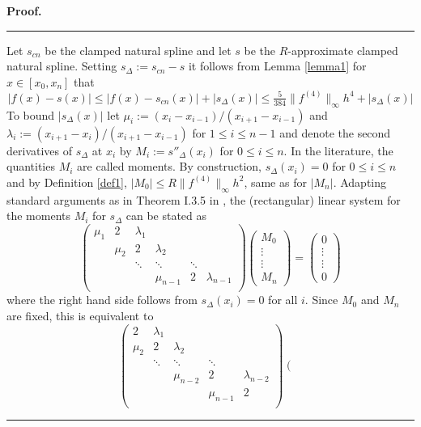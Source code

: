 \documentclass[12pt]{article}
\newenvironment{proof}{\begin{list}{$\!\!${\bf Proof.}%
  \rule{1pt}{0pt}}{\setlength{\leftmargin}{0pt}%
  \setlength{\itemindent}{30pt}%
  \setlength{\listparindent}{15pt}}\item}{\rule{0.3em}{0mm}%
  \hfill\framebox[1.2ex]{\rule{0.3em}{0mm}}\end{list}}
\begin{document}
\begin{proof}
Let $s_{cn}$ be the clamped natural spline and let $s$
be the $R$-approximate clamped natural spline. Setting $s_\Delta:=s_{cn}-s$
it follows from Lemma \ref{lemma1}  for $x\in[x_0,x_n]$ that
$$
|f(x)-s(x)|\le |f(x)-s_{cn}(x)| + |s_\Delta(x)|
\le \tfrac{5}{384}\|f^{(4)}\|_\infty h^4+ |s_\Delta(x)|
$$
To bound $ |s_\Delta(x)|$
let $\mu_i:=(x_{i}-x_{i-1})/(x_{i+1}-x_{i-1})$ and $\lambda_i:=(x_{i+1}-x_{i})/(x_{i+1}-x_{i-1})$
for $1\le i\le n-1$
and denote the second derivatives of $s_\Delta$ at $x_i$ by $M_i:=s''_\Delta(x_i)$
for $0\le i\le n$. In the literature, the quantities
$M_i$ are called moments.
By construction, $s_\Delta(x_i)=0$ for  $0\le i\le n$
and by Definition \ref{def1},
$|M_0|\le R\|f^{(4)}\|_\infty h^2$,
same as for $|M_n|$.
Adapting standard arguments as in Theorem I.3.5 in \cite{Verfuerth},
the (rectangular) linear system for the moments $M_i$
for $s_\Delta$ can be stated as
$$
\left(\begin{matrix}
  \mu_1 & 2 & \lambda_1 & & & \\
  & \mu_2 & 2 & \lambda_2 & & \\
  & & \ddots & \ddots & \ddots & \\ 
  & & & \mu_{n-1} & 2 & \lambda_{n-1}  \\
\end{matrix}\right)
\left(\begin{matrix}
  M_0  \\
  \vdots \\
  \vdots \\
  M_n    
\end{matrix}\right)
=
\left(\begin{matrix}
  0  \\
  \vdots \\
  \vdots \\
  0    
\end{matrix}\right)
$$
where the right hand side follows from   $s_\Delta(x_i)=0$ for all $i$.
Since $M_0$ and $M_n$ are fixed, this is equivalent to 
$$
\left(\begin{matrix}
   2 & \lambda_1 & & & \\
   \mu_2 & 2 & \lambda_2 & & \\
   & \ddots & \ddots & \ddots & \\ 
    &  & \mu_{n-2} & 2 & \lambda_{n-2}  \\ 
    & & & \mu_{n-1} & 2   \\
\end{matrix}\right)
\left(\begin{matrix}

\end{matrix}$$
\end{proof}
\end{document}
